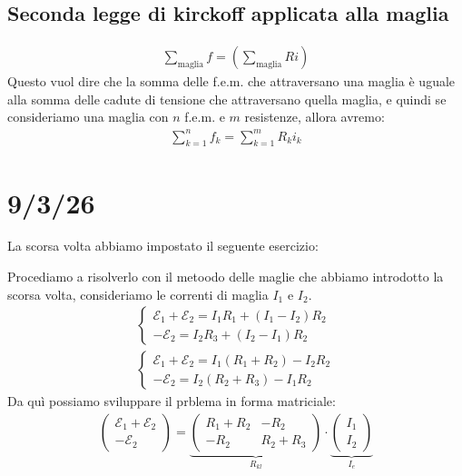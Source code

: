 \documentclass[a4paper, oneside]{article}
\begin{document}
\subsection{Seconda legge di kirckoff applicata alla maglia}
\begin{gather*}
    \sum_\text{maglia} f = (\sum_\text{maglia} R i)
\end{gather*}
Questo vuol dire che la somma delle f.e.m. che attraversano una maglia è uguale alla somma delle cadute di tensione che attraversano quella maglia, e quindi se consideriamo una maglia con $n$ f.e.m. e $m$ resistenze, allora avremo:
\begin{gather*}
    \sum_{k=1}^{n} f_k = \sum_{k=1}^{m} R_k i_k
\end{gather*}
\newpage
\section{9/3/26}
La scorsa volta abbiamo impostato il seguente esercizio:
\begin{center}
\end{center}
Procediamo a risolverlo con il metoodo delle maglie che abbiamo introdotto la scorsa volta, consideriamo le correnti di maglia $I_1$ e $I_2$.
\begin{gather*}
    \begin{cases}
        \mathcal{E}_1 + \mathcal{E}_2 = I_1 R_1 + (I_1 - I_2) R_2\\
        -\mathcal{E}_2 = I_2 R_3 + (I_2 - I_1) R_2
    \end{cases}\\
    \begin{cases}
        \mathcal{E}_1 + \mathcal{E}_2 = I_1 (R_1 + R_2) - I_2 R_2\\
        -\mathcal{E}_2 = I_2 (R_2 + R_3) - I_1 R_2
    \end{cases}
\end{gather*}
Da quì possiamo sviluppare il prblema in forma matriciale:
\begin{gather*}
    \begin{pmatrix}
        \mathcal{E}_1 + \mathcal{E}_2\\
        -\mathcal{E}_2
    \end{pmatrix} = \underbrace{\begin{pmatrix}
        R_1 + R_2 & -R_2\\
        -R_2 & R_2 + R_3
    \end{pmatrix}}_{R_{kl}} \cdot
    \underbrace{\begin{pmatrix}
        I_1\\
        I_2
    \end{pmatrix}}_{I_e}
\end{gather*}
\end{document}

